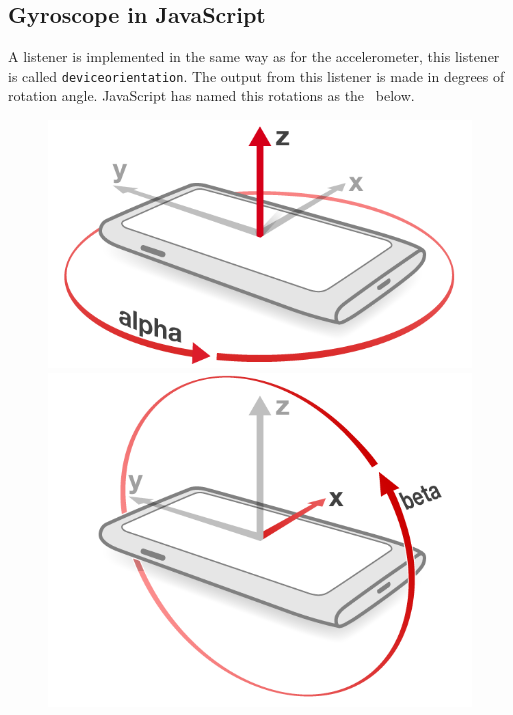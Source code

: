 \subsection{Gyroscope in JavaScript}\label{subsec:gyroJS}
A listener is implemented in the same way as for the accelerometer, this listener is called \texttt{deviceorientation}. The output from this listener is made in degrees of rotation angle. JavaScript has named this rotations as the~ below.
\begin{figure}[H]
  \hspace{-1cm}
  \centering
  \begin{minipage}[c]{.23\textwidth}
    \centering
    \includegraphics[scale=0.2]{img/device-alpha}
  \end{minipage}
  \hspace{1cm}
  \begin{minipage}[c]{.23\textwidth}
    \centering
    \includegraphics[scale=0.2]{img/device-beta}

\end{minipage}
\end{figure}

